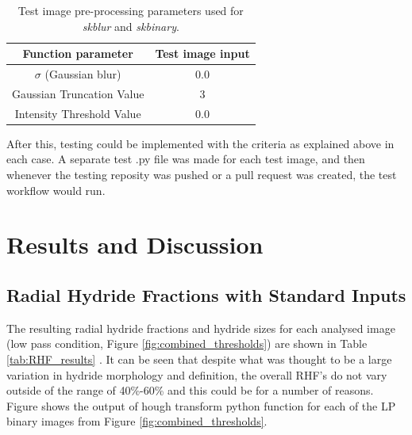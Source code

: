 \documentclass{article}
\begin{document}
    \begin{table}[h]
        \centering
        \begin{tabular}{|c|c|}
        \hline
            \textbf{Function parameter} & \textbf{Test image input}  \\
            \hline
            $\sigma$ (Gaussian blur) & 0.0 \\
            \hline
            Gaussian Truncation Value & 3 \\
            \hline
            Intensity Threshold Value & 0.0 \\ 
        \hline
        \end{tabular}
    \caption{Test image pre-processing parameters used for \textit{skblur} and \textit{skbinary}.}
    \label{tab:TestImageTable}
    \end{table}

    \noindent After this, testing could be implemented with the criteria as explained above in each case. A separate test .py file was made for each test image, and then whenever the testing reposity was pushed or a pull request was created, the test workflow would run.

\section{Results and Discussion}
\subsection{Radial Hydride Fractions with Standard Inputs}
    The resulting radial hydride fractions and hydride sizes for each analysed image (low pass condition, Figure \ref{fig:combined_thresholds}) are shown in Table \ref{tab:RHF_results} . It can be seen that despite what was thought to be a large variation in hydride morphology and definition, the overall RHF's do not vary outside of the range of 40\%-60\% and this could be for a number of reasons. Figure shows the output of hough transform python function for each of the LP binary images from Figure \ref{fig:combined_thresholds}.
\end{document}
